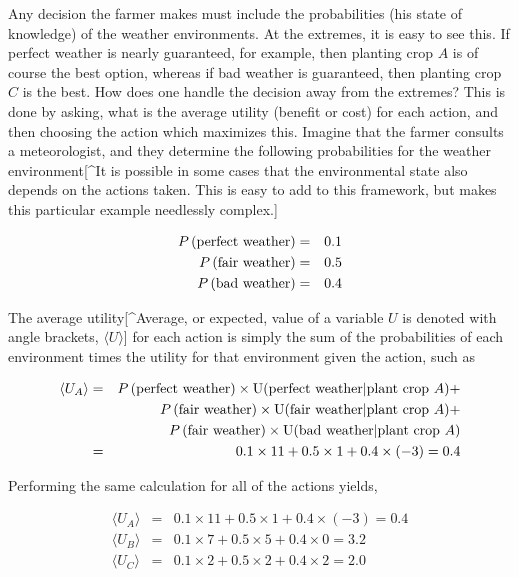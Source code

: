 \documentclass{tufte-book}
\begin{document}
Any decision the farmer makes must include the probabilities (his state
of knowledge) of the weather environments. At the extremes, it is easy
to see this. If perfect weather is nearly guaranteed, for example, then
planting crop \(A\) is of course the best option, whereas if bad weather
is guaranteed, then planting crop \(C\) is the best. How does one handle
the decision away from the extremes? This is done by asking, what is the
average utility (benefit or cost) for each action, and then choosing the
action which maximizes this. Imagine that the farmer consults a
meteorologist, and they determine the following probabilities for the
weather environment{[}\^{}It is possible in some cases that the
environmental state also depends on the actions taken. This is easy to
add to this framework, but makes this particular example needlessly
complex.{]}

\begin{eqnarray*}
\P{perfect weather}&=&0.1 \\
\P{fair weather}&=&0.5 \\
\P{bad weather}&=&0.4 \\
\end{eqnarray*}

The average utility{[}\^{}Average, or expected, value of a variable
\(U\) is denoted with angle brackets, \(\langle U \rangle\){]} for each
action is simply the sum of the probabilities of each environment times
the utility for that environment given the action, such as

\begin{eqnarray*}
\langle U_A \rangle &=& \P{perfect weather}\times {\rm U}(\mbox{perfect weather}|\mbox{plant crop $A$}) + \\
&& \P{fair weather}\times {\rm U}(\mbox{fair weather}|\mbox{plant crop $A$}) + \\
&& \P{fair weather}\times {\rm U}(\mbox{bad weather}|\mbox{plant crop $A$}) \\
&=& 0.1 \times 11 + 0.5 \times 1 + 0.4\times (-3) = 0.4
\end{eqnarray*}

Performing the same calculation for all of the actions yields,

\begin{eqnarray*}
\langle U_A \rangle &=& 0.1 \times 11 + 0.5 \times 1 + 0.4\times (-3) = 0.4 \\
\langle U_B \rangle &=& 0.1 \times 7 + 0.5 \times 5 + 0.4\times 0 = 3.2 \\
\langle U_C \rangle &=& 0.1 \times 2 + 0.5 \times 2 + 0.4\times 2 = 2.0
\end{eqnarray*}
\end{document}
